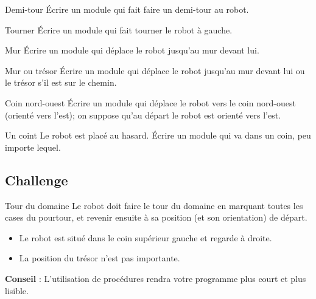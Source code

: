 		\begin{Exercice}{Demi-tour}
			Écrire un module qui fait faire un demi-tour au robot.
		\end{Exercice}

		\begin{Exercice}{Tourner}
			Écrire un module qui fait tourner le robot à gauche.
		\end{Exercice}

		\begin{Exercice}{Mur}
			Écrire un module qui déplace le robot
			jusqu'au mur devant lui.
		\end{Exercice}

		\begin{Exercice}{Mur ou trésor}
			Écrire un module qui déplace le robot jusqu'au mur
			devant lui ou le trésor s'il est sur le chemin.
		\end{Exercice}

		\begin{Exercice}{Coin nord-ouest}
			Écrire un module qui déplace le robot vers le coin nord-ouest 
			(orienté vers l'est); on suppose qu'au départ
			le robot est orienté vers l'est.
		\end{Exercice}

		\begin{Exercice}{Un coint}
			Le robot est placé au hasard. Écrire un module qui va dans un coin, peu
			importe lequel. 
		\end{Exercice}

	\subsection{Challenge}

		\begin{Exercice}{Tour du domaine}
			Le robot doit faire le tour du domaine en marquant toutes les cases du
			pourtour, et revenir ensuite à sa position (et son orientation) de
			départ.

			\begin{itemize}
			\item Le robot est situé dans le coin supérieur gauche et regarde à droite.
			\item La position du trésor n'est pas importante.
			\end{itemize}

			\textbf{Conseil} : L'utilisation de procédures rendra
			votre programme plus court et plus lisible.
		\end{Exercice}

